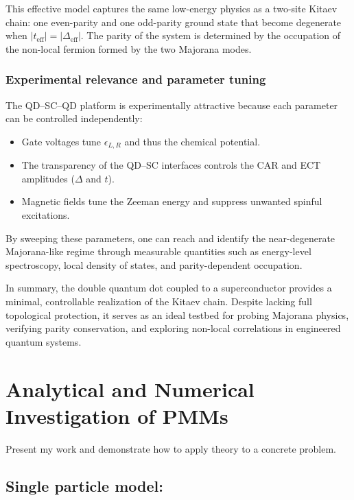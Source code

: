 \documentclass[11pt, letterpaper, titlepage]{article}
\begin{document}
This effective model captures the same low-energy physics as a two-site Kitaev chain: one even-parity and one odd-parity ground state that become degenerate when $|t_{\mathrm{eff}}| = |\Delta_{\mathrm{eff}}|$. The parity of the system is determined by the occupation of the non-local fermion formed by the two Majorana modes.

\subsubsection{Experimental relevance and parameter tuning}

The QD–SC–QD platform is experimentally attractive because each parameter can be controlled independently:
\begin{itemize}
    \item Gate voltages tune $\epsilon_{L,R}$ and thus the chemical potential.
    \item The transparency of the QD–SC interfaces controls the CAR and ECT amplitudes ($\Delta$ and $t$).
    \item Magnetic fields tune the Zeeman energy and suppress unwanted spinful excitations.
\end{itemize}
By sweeping these parameters, one can reach and identify the near-degenerate Majorana-like regime through measurable quantities such as energy-level spectroscopy, local density of states, and parity-dependent occupation.

In summary, the double quantum dot coupled to a superconductor provides a minimal, controllable realization of the Kitaev chain. Despite lacking full topological protection, it serves as an ideal testbed for probing Majorana physics, verifying parity conservation, and exploring non-local correlations in engineered quantum systems.


\section{Analytical and Numerical Investigation of PMMs}
Present my work and demonstrate how to apply theory to a concrete problem.\par
\subsection{Single particle model:}
\end{document}
